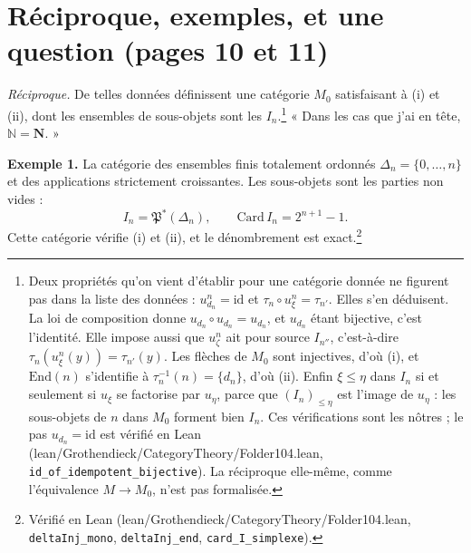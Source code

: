 \documentclass[11pt,a4paper]{article}
\begin{document}
\section*{Réciproque, exemples, et une question (pages 10 et 11)}

\emph{Réciproque.} De telles données définissent une catégorie $M_{0}$
satisfaisant à (i) et (ii), dont les ensembles de sous-objets sont les
$I_{n}$.\footnote{Deux propriétés qu'on vient d'établir pour une catégorie
donnée ne figurent pas dans la liste des données : $u^{n}_{d_{n}} =
\mathrm{id}$ et $\tau_{n} \circ u^{n}_{\xi} = \tau_{n'}$. Elles s'en
déduisent. La loi de composition donne $u_{d_{n}} \circ u_{d_{n}} = u_{d_{n}}$,
et $u_{d_{n}}$ étant bijective, c'est l'identité. Elle impose aussi que
$u^{n}_{\zeta}$ ait pour source $I_{n''}$, c'est-à-dire
$\tau_{n}(u^{n}_{\xi}(y)) = \tau_{n'}(y)$. Les flèches de $M_{0}$ sont
injectives, d'où (i), et $\mathrm{End}(n)$ s'identifie à
$\tau_{n}^{-1}(n) = \{d_{n}\}$, d'où (ii). Enfin $\xi \leq \eta$ dans $I_{n}$
si et seulement si $u_{\xi}$ se factorise par $u_{\eta}$, parce que
$(I_{n})_{\leq \eta}$ est l'image de $u_{\eta}$ : les sous-objets de $n$ dans
$M_{0}$ forment bien $I_{n}$. Ces vérifications sont les nôtres ; le pas
$u_{d_{n}} = \mathrm{id}$ est vérifié en Lean
(lean/Grothendieck/CategoryTheory/Folder104.lean, \texttt{id\_of\_idempotent\_bijective}). La
réciproque elle-même, comme l'équivalence $M \to M_{0}$, n'est pas
formalisée.} « Dans les cas
que j'ai en tête, $\mathbb{N} = \mathbf{N}$. »

\textbf{Exemple 1.} La catégorie des ensembles finis totalement ordonnés
$\Delta_{n} = \{0, \ldots, n\}$ et des applications strictement croissantes.
Les sous-objets sont les parties non vides :
\[
I_{n} = \mathfrak{P}^{*}(\Delta_{n}), \qquad
\mathrm{Card}\, I_{n} = 2^{n+1} - 1 .
\]
Cette catégorie vérifie (i) et (ii), et le dénombrement est
exact.\footnote{Vérifié en Lean (lean/Grothendieck/CategoryTheory/Folder104.lean,
\texttt{deltaInj\_mono}, \texttt{deltaInj\_end}, \texttt{card\_I\_simplexe}).}
\end{document}
